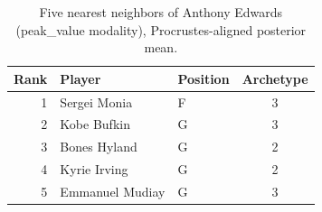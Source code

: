 \begin{table}[htbp]
  \centering\small
  \begin{tabular}{rllc}
    \toprule
    Rank & Player & Position & Archetype \\
    \midrule
    1 & Sergei Monia & F & 3 \\
    2 & Kobe Bufkin & G & 3 \\
    3 & Bones Hyland & G & 2 \\
    4 & Kyrie Irving & G & 2 \\
    5 & Emmanuel Mudiay & G & 3 \\
    \bottomrule
  \end{tabular}
  \caption{Five nearest neighbors of Anthony Edwards (peak_value modality), Procrustes-aligned posterior mean.}
  \label{tab:Anthony_Edwards_neighbors_peak_value}
\end{table}


